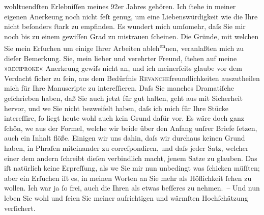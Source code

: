                wohltuendſten Erlebniſſen  meines 92er Jahres
               gehören. Ich ſtehe in meiner eigenen Anerke{\geminationn}ung noch
               nicht feſt genug, um eine Liebenswürdigkeit wie die Ihre nicht beſonders ſtark zu
               empfinden. Es wundert mich umſomehr, daſs Sie mir noch bis zu einem gewiſſen Grad zu
               mistrauen ſcheinen. Die Gründe, mit welchen Sie mein Erſuchen um einige Ihrer
               Arbeiten ableh\substVorne{}\textsuperscript{en}\substDazwischen{}nen\substHinten{}, {\pb}veranlaßten mich zu dieſer Bemerkung. Sie, mein
               lieber und verehrter Freund, ſtehen auf meine »\textsc{reciproke}«
                  Anerke{\geminationn}ung gewiſs nicht an, und ich meinerſeits
               glaube vor dem Verdacht ſicher zu ſein, aus dem Bedürfnis \textsc{Revanche}freundlichkeiten auszutheilen mich für Ihre Manuscripte zu
               intereſſieren. Daſs Sie manches Dramatiſche geſchrieben haben, daß Sie auch jetzt für
               gut halten, geht aus \label{K_L03942-2v}\label{K_L03942-2} mit Sicherheit hervor,
               und we{\geminationn} Sie \label{K_L03942-3v}\label{K_L03942-3} nicht
               bezweifelt haben, daſs ich mich für Ihre Stücke intereſſire, ſo liegt heute wohl auch
               kein Grund dafür vor. Es wäre doch ganz ſchön, we{\geminationn} aus der Formel, welche wir beide
               über den Anfang unſrer Briefe ſetzen, auch ein Inhalt flöße. Einigen wir uns dahin,
               daſs wir durchaus keinen Grund haben, in Phraſen {\pb}miteinander zu correſpondiren, und
               daſs jeder Satz, welcher einer dem andern ſchreibt dieſen verbindlich macht, jenem
               Satze zu glauben. Das iſt natürlich keine Erpreſſung, als we{\geminationn} Sie mir nun unbedingt
               was ſchicken müſſten; aber ein Erſuchen iſt es, in meinen Worten an Sie mehr als
               Höflichkeit ſehen zu wollen. Ich war ja ſo frei, auch die Ihren als etwas
               beſſeres zu nehmen. – Und nun leben {\pb}Sie wohl und ſeien Sie meiner aufrichtigen und
               wärmſten Hochſchätzung verſichert.\pend
           
